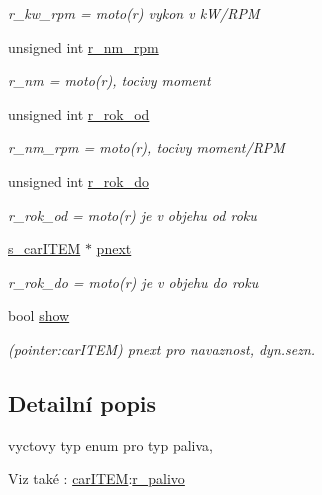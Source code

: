 \begin{DoxyCompactItemize}
\begin{DoxyCompactList}\small\item\em r\-\_\-kw\-\_\-rpm = moto(r) vykon v k\-W/\-R\-P\-M \end{DoxyCompactList}\item 
unsigned int \hyperlink{structs__carITEM_a712a5a7cbd59dc84a426168f834da8a2}{r\-\_\-nm\-\_\-rpm}
\begin{DoxyCompactList}\small\item\em r\-\_\-nm = moto(r), tocivy moment \end{DoxyCompactList}\item 
unsigned int \hyperlink{structs__carITEM_a13180f6d951508be29c8612bdb88229e}{r\-\_\-rok\-\_\-od}
\begin{DoxyCompactList}\small\item\em r\-\_\-nm\-\_\-rpm = moto(r), tocivy moment/\-R\-P\-M \end{DoxyCompactList}\item 
unsigned int \hyperlink{structs__carITEM_a2bdee748226e3ff73959a766dbd00315}{r\-\_\-rok\-\_\-do}
\begin{DoxyCompactList}\small\item\em r\-\_\-rok\-\_\-od = moto(r) je v objehu od roku \end{DoxyCompactList}\item 
\hyperlink{structs__carITEM}{s\-\_\-car\-I\-T\-E\-M} $\ast$ \hyperlink{structs__carITEM_a934faba6a15cd1f9836ad59caa0214a0}{pnext}
\begin{DoxyCompactList}\small\item\em r\-\_\-rok\-\_\-do = moto(r) je v objehu do roku \end{DoxyCompactList}\item 
bool \hyperlink{structs__carITEM_a687529357a76cad13a85d8bbffc092be}{show}
\begin{DoxyCompactList}\small\item\em (pointer\-:car\-I\-T\-E\-M) pnext pro navaznost, dyn.\-sezn. \end{DoxyCompactList}\end{DoxyCompactItemize}


\subsection{\-Detailní popis}
vyctovy typ enum pro typ paliva, 

\begin{DoxySeeAlso}{\-Viz také}
\-: \hyperlink{io_8h_ab185ce476fadf726e050c47e0ca3e717}{car\-I\-T\-E\-M}\-:\hyperlink{structs__carITEM_a381b61a73e3f24bf12eb8db98616d0e6}{r\-\_\-palivo} 
\end{DoxySeeAlso}


